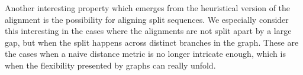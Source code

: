 \documentclass[thesis.tex]{subfiles}
\begin{document}
\par\noindent
Another interesting property which emerges from the heuristical version of the alignment is the possibility for aligning split sequences. We especially consider this interesting in the cases where the alignments are not split apart by a large gap, but when the split happens across distinct branches in the graph. These are the cases when a naive distance metric is no longer intricate enough, which is when the flexibility presented by graphs can really unfold.
\end{document}
